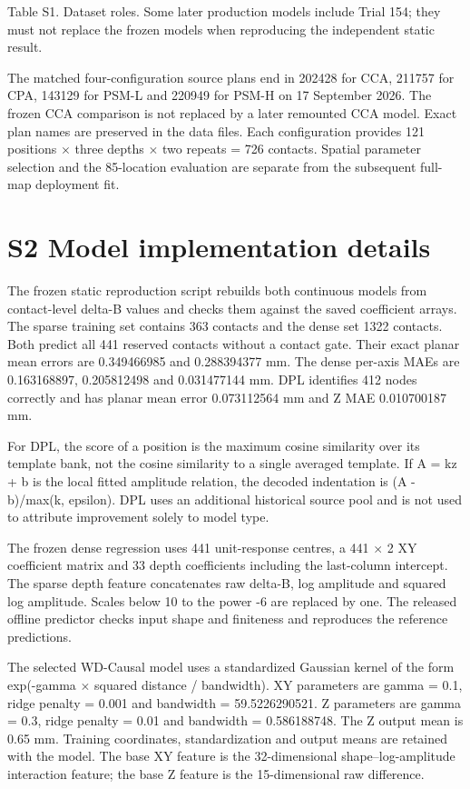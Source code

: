 \documentclass[preprint,12pt]{elsarticle}
\begin{document}
Table S1. Dataset roles. Some later production models include Trial 154; they must not replace the frozen models when reproducing the independent static result.

The matched four-configuration source plans end in 202428 for CCA, 211757 for CPA, 143129 for PSM-L and 220949 for PSM-H on 17 September 2026. The frozen CCA comparison is not replaced by a later remounted CCA model. Exact plan names are preserved in the data files. Each configuration provides 121 positions \ensuremath{\times} three depths \ensuremath{\times} two repeats = 726 contacts. Spatial parameter selection and the 85-location evaluation are separate from the subsequent full-map deployment fit.

\section{S2 Model implementation details}

The frozen static reproduction script rebuilds both continuous models from contact-level delta-B values and checks them against the saved coefficient arrays. The sparse training set contains 363 contacts and the dense set 1322 contacts. Both predict all 441 reserved contacts without a contact gate. Their exact planar mean errors are 0.349466985 and 0.288394377 mm. The dense per-axis MAEs are 0.163168897, 0.205812498 and 0.031477144 mm. DPL identifies 412 nodes correctly and has planar mean error 0.073112564 mm and Z MAE 0.010700187 mm.

For DPL, the score of a position is the maximum cosine similarity over its template bank, not the cosine similarity to a single averaged template. If A = kz + b is the local fitted amplitude relation, the decoded indentation is (A - b)/max(k, epsilon). DPL uses an additional historical source pool and is not used to attribute improvement solely to model type.

The frozen dense regression uses 441 unit-response centres, a 441 \ensuremath{\times} 2 XY coefficient matrix and 33 depth coefficients including the last-column intercept. The sparse depth feature concatenates raw delta-B, log amplitude and squared log amplitude. Scales below 10 to the power -6 are replaced by one. The released offline predictor checks input shape and finiteness and reproduces the reference predictions.

The selected WD-Causal model uses a standardized Gaussian kernel of the form exp(-gamma \ensuremath{\times} squared distance / bandwidth). XY parameters are gamma = 0.1, ridge penalty = 0.001 and bandwidth = 59.5226290521. Z parameters are gamma = 0.3, ridge penalty = 0.01 and bandwidth = 0.586188748. The Z output mean is 0.65 mm. Training coordinates, standardization and output means are retained with the model. The base XY feature is the 32-dimensional shape--log-amplitude interaction feature; the base Z feature is the 15-dimensional raw difference.
\end{document}
